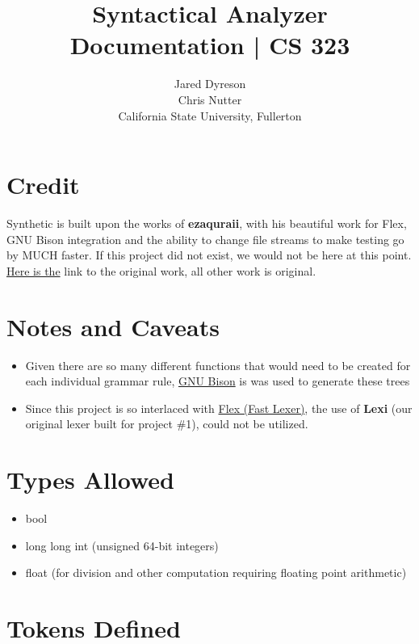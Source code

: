 \documentclass{article}
\title{Syntactical Analyzer Documentation | CS 323}
\author{Jared Dyreson\\ 
        Chris Nutter \\
        California State University, Fullerton}
\date
\begin{document}
\maketitle
\tableofcontents

\newpage

\section{Credit}

Synthetic is built upon the works of \textbf{ezaquraii}, with his beautiful work for
Flex, GNU Bison integration and the ability to change file streams to make
testing go by MUCH faster. If this project did not exist, we would not be here at
this point. \href{https://github.com/ezaquarii/bison-flex-cpp-example}{Here is the} link to the original work, all other work is original.

\section{Notes and Caveats}

\begin{itemize}
\item Given there are so many different functions that would need to be created for each individual grammar rule, \href{https://www.gnu.org/software/bison/}{GNU Bison} is was used to generate these trees
\item Since this project is so interlaced with \href{https://github.com/westes/flex/blob/master/README.md}{Flex (Fast Lexer)}, the use of \textbf{Lexi} (our original lexer built for project \#1), could not be utilized.
\end{itemize}

\section{Types Allowed}

\begin{itemize}
\item bool
\item long long int (unsigned 64-bit integers)
\item float (for division and other computation requiring floating point arithmetic)
\end{itemize}

\section{Tokens Defined}
\end{document}
